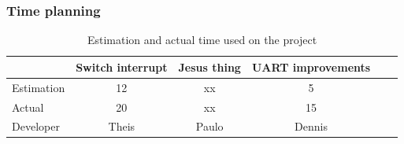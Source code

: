 \subsubsection{Time planning}

\begin{table}[H]
\centering
	\begin{tabular}{|l|c|c|c|c|c|}
		\hline
		~			& Switch interrupt		& Jesus thing		& UART improvements	\\ \hline
		Estimation	& 12					& xx				& 5					\\
		Actual		& 20					& xx				& 15					\\
		Developer	& Theis				& Paulo			& Dennis				\\
		\hline
	\end{tabular}
	\caption{Estimation and actual time used on the project}
\end{table}

